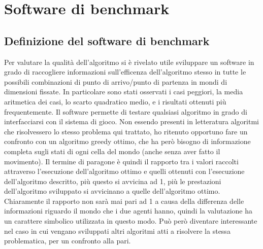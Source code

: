 \chapter{Software di benchmark}
\section{Definizione del software di benchmark}
Per valutare la qualità dell'algoritmo si è rivelato utile sviluppare un software in grado di raccogliere informazioni sull'efficenza dell'algoritmo stesso in tutte le possibili combinazioni di punto di arrivo/punto di partenza in mondi di dimensioni fissate. In particolare sono stati osservati i casi peggiori, la media aritmetica dei casi, lo scarto quadratico medio, e i risultati ottenuti più frequentemente. Il software permette di testare qualsiasi algoritmo in grado di interfacciarsi con il sistema di gioco. Non essendo presenti in letteratura algoritmi che risolvessero lo stesso problema qui trattato, ho ritenuto opportuno fare un confronto con un algoritmo greedy ottimo, che ha però bisogno di informazione completa sugli stati di ogni cella del mondo (anche senza aver fatto il movimento). Il termine di paragone è quindi il rapporto tra i valori raccolti attraverso l'esecuzione dell'algoritmo ottimo e quelli ottenuti con l'esecuzione dell'algoritmo descritto, più questo si avvicina ad 1, più le prestazioni dell'algoritmo sviluppato si avvicinano a quelle dell'algoritmo ottimo. Chiaramente il rapporto non sarà mai pari ad 1 a causa della differenza delle informazioni riguardo il mondo che i due agenti hanno, quindi la valutazione ha un carattere simbolico utilizzata in questo modo. Può però diventare interessante nel caso in cui vengano sviluppati altri algoritmi atti a risolvere la stessa problematica, per un confronto alla pari.

